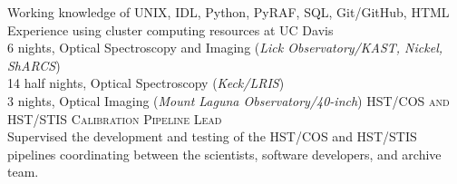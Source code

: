 \documentclass[10pt]{cv}
\begin{document}
\begin{llist}
\vspace{-0.1in}  
Working knowledge of UNIX, IDL, Python, PyRAF, SQL, Git/GitHub, HTML\\
Experience using cluster computing resources at UC Davis\\ 
%
\vspace{-0.1in}   
6 nights, Optical Spectroscopy and Imaging ({\it Lick Observatory/KAST, Nickel, ShARCS})\\
14 half nights, Optical Spectroscopy ({\it Keck/LRIS})\\
3 nights, Optical Imaging ({\it Mount Laguna Observatory/40-inch})
%
\vspace{-0.1in}   
\textsc{HST/COS and HST/STIS Calibration Pipeline Lead}\\
Supervised the development and testing of the HST/COS and HST/STIS pipelines coordinating between the scientists, software developers, and archive team. \\

\end{llist}
\end{document}
